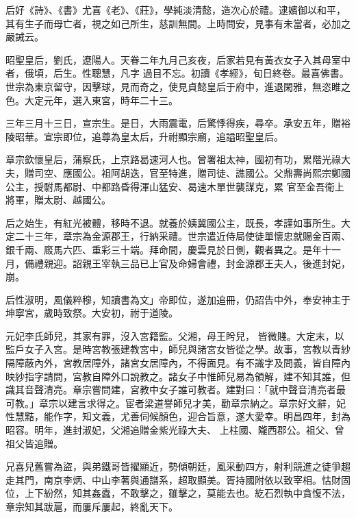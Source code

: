 \begin{pinyinscope}
 后好《詩》、《書》尤喜《老》、《莊》，學純淡清懿，造次心於禮。逮嬪御以和平，其有生子而母亡者，視之如己所生，慈訓無間。上時問安，見事有未當者，必加之嚴誡云。



 昭聖皇后，劉氏，遼陽人。天眷二年九月己亥夜，后家若見有黃衣女子入其母室中者，俄頃，后生。性聰慧，凡字
 過目不忘。初讀《孝經》，旬日終卷。最喜佛書。世宗為東京留守，因擊球，見而奇之，使見貞懿皇后于府中，進退閑雅，無恣睢之色。大定元年，選入東宮，時年二十三。



 三年三月十三日，宣宗生。是日，大雨震電，后驚悸得疾，尋卒。承安五年，贈裕陵昭華。宣宗即位，追尊為皇太后，升祔顯宗廟，追謚昭聖皇后。



 章宗欽懷皇后，蒲察氏，上京路曷速河人也。曾署祖太神，國初有功，累階光祿大夫，贈司空、應國公。祖阿胡迭，官至特進，贈司徒、譙國公。父鼎壽尚熙宗鄭國公主，授駙馬都尉、中都路昏得渾山猛安、曷速木單世襲謀克，累
 官至金吾衛上將軍，贈太尉、越國公。



 后之始生，有紅光被體，移時不退。就養於姨冀國公主，既長，孝謹如事所生。大定二十三年，章宗為金源郡王，行納采禮。世宗遣近侍局使徒單懷忠就賜金百兩、銀千兩、廄馬六匹、重彩三十端。拜命間，慶雲見於日側，觀者異之。是年十一月，備禮親迎。詔親王宰執三品已上官及命婦會禮，封金源郡王夫人，後進封妃，崩。



 后性淑明，風儀粹穆，知讀書為文」帝即位，遂加追冊，仍詔告中外，奉安神主于坤寧宮，歲時致祭。大安初，祔于道陵。



 元妃李氏師兒，其家有罪，沒入宮籍監。父湘，母王盻兒，
 皆微賤。大定末，以監戶女子入宮。是時宮教張建教宮中，師兒與諸宮女皆從之學。故事，宮教以青紗隔障蔽內外，宮教居障外，諸宮女居障內，不得面見。有不識字及問義，皆自障內映紗指字請問，宮教自障外口說教之。諸女子中惟師兒易為領解，建不知其誰，但識其音聲清亮。章宗嘗問建，宮教中女子誰可教者。建對曰：「就中聲音清亮者最可教。」章宗以建言求得之。宦者梁道譽師兒才美，勸章宗納之。章宗好文辭，妃性慧黠，能作字，知文義，尤善伺候顏色，迎合旨意，遂大愛幸。明昌四年，封為昭容。明年，進封淑妃，父湘追贈金紫光祿大夫、
 上柱國、隴西郡公。祖父、曾祖父皆追贈。



 兄喜兒舊嘗為盜，與弟鐵哥皆擢顯近，勢傾朝廷，風采動四方，射利競進之徒爭趨走其門，南京李炳、中山李著與通譜系，超取顯美。胥持國附依以致宰相。怙財固位，上下紛然，知其姦蠹，不敢擊之，雖擊之，莫能去也。紇石烈執中貪愎不法，章宗知其跋扈，而屢斥屢起，終亂天下。




\end{pinyinscope}
